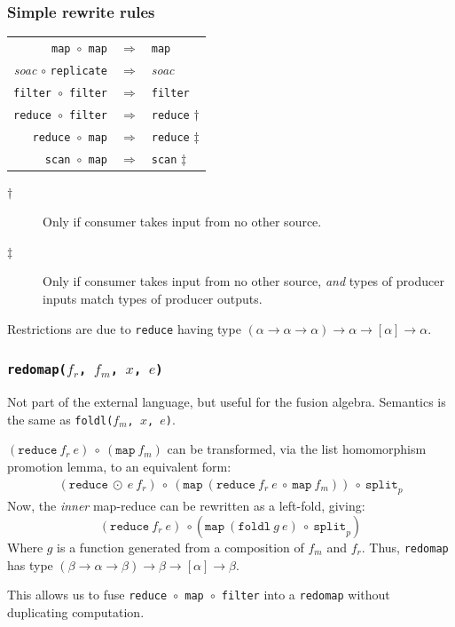 \documentclass{beamer}
\begin{document}
\begin{frame}[fragile]
  \frametitle{Simple rewrite rules}

  \begin{center}
    \begin{tabular}{rcl}
      \texttt{map $\circ$ map}    & $\Rightarrow$ & \texttt{map} \\
      \textit{soac} $\circ$ \texttt{replicate} & $\Rightarrow$ & \textit{soac} \\
      \texttt{filter $\circ$ filter} & $\Rightarrow$ & \texttt{filter}  \\
      \texttt{reduce $\circ$ filter} & $\Rightarrow$ & \texttt{reduce} $\dag$  \\
      \texttt{reduce $\circ$ map} & $\Rightarrow$ & \texttt{reduce} $\ddag$ \\
      \texttt{scan $\circ$ map} & $\Rightarrow$ & \texttt{scan} $\ddag$ \\
    \end{tabular}
  \end{center}

  \begin{description}
  \item[$\dag$] Only if consumer takes input from no other
    source.
  \item[$\ddag$] Only if consumer takes input from no other source,
    \textit{and} types of producer inputs match types of producer
    outputs.
  \end{description}

  Restrictions are due to \texttt{reduce} having type
  $(\alpha\rightarrow\alpha\rightarrow\alpha)\rightarrow\alpha\rightarrow[\alpha]\rightarrow\alpha$.

\end{frame}

\begin{frame}[fragile,t]
  \frametitle{  \texttt{redomap($f_{r}$, $f_{m}$, $x$, $e$)}}

  Not part of the external language, but useful for the fusion
  algebra.  Semantics is the same as \texttt{\tt foldl($f_{m}$, $x$, $e$)}.

  $(\texttt{reduce}\ f_{r}\ e)\ \circ\ (\texttt{map}\ f_{m})$ can be
  transformed, via the list homomorphism promotion lemma, to an
  equivalent form:
  \begin{gather*}
    (\texttt{reduce}\ \odot\
    e\ f_{r})\ \circ\ (\texttt{map}\ ({\texttt{reduce}\ f_{r}\ e\ \circ\ \texttt{map}\ f_{m}}))\ \circ\ \texttt{split}_{p}
  \end{gather*}
  Now, the \textit{inner} map-reduce can be rewritten as a left-fold,
  giving:
  \[
  (\texttt{reduce}\ f_{r}\
  e)\ \circ (\texttt{map} \ ({\texttt{foldl}\ g\ e})\ \circ\ \texttt{split}_{p})
  \]
  Where $g$ is a function generated from a composition of $f_{m}$ and
  $f_{r}$.  Thus, \texttt{redomap} has type
  $(\beta\rightarrow\alpha\rightarrow\beta)\rightarrow\beta\rightarrow[\alpha]\rightarrow\beta$.

This allows us to fuse
  \texttt{reduce~$\circ$~map~$\circ$~filter} into a \texttt{redomap}
  without duplicating computation.
\end{frame}
\end{document}
